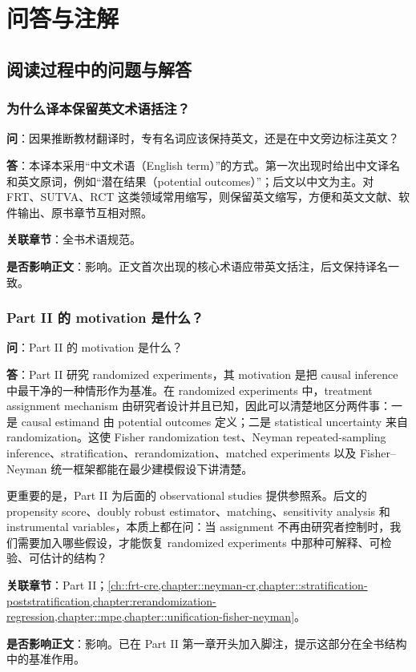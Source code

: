 \chapter{问答与注解}

\section{阅读过程中的问题与解答}

\subsection{为什么译本保留英文术语括注？}\label{sec:qa-english-term-parentheses}

\textbf{问}：因果推断教材翻译时，专有名词应该保持英文，还是在中文旁边标注英文？

\textbf{答}：本译本采用“中文术语（English term）”的方式。第一次出现时给出中文译名和英文原词，例如“潜在结果（potential outcomes）”；后文以中文为主。对 FRT、SUTVA、RCT 这类领域常用缩写，则保留英文缩写，方便和英文文献、软件输出、原书章节互相对照。

\textbf{关联章节}：全书术语规范。

\textbf{是否影响正文}：影响。正文首次出现的核心术语应带英文括注，后文保持译名一致。

\subsection{Part II 的 motivation 是什么？}\label{sec:qa-part-ii-motivation}

\textbf{问}：Part II 的 motivation 是什么？

\textbf{答}：Part II 研究 randomized experiments，其 motivation 是把 causal inference 中最干净的一种情形作为基准。在 randomized experiments 中，treatment assignment mechanism 由研究者设计并且已知，因此可以清楚地区分两件事：一是 causal estimand 由 potential outcomes 定义；二是 statistical uncertainty 来自 randomization。这使 Fisher randomization test、Neyman repeated-sampling inference、stratification、rerandomization、matched experiments 以及 Fisher--Neyman 统一框架都能在最少建模假设下讲清楚。

更重要的是，Part II 为后面的 observational studies 提供参照系。后文的 propensity score、doubly robust estimator、matching、sensitivity analysis 和 instrumental variables，本质上都在问：当 assignment 不再由研究者控制时，我们需要加入哪些假设，才能恢复 randomized experiments 中那种可解释、可检验、可估计的结构？

\textbf{关联章节}：Part II；\cref{ch::frt-cre,chapter::neyman-cr,chapter::stratification-poststratification,chapter:rerandomization-regression,chapter::mpe,chapter::unification-fisher-neyman}。

\textbf{是否影响正文}：影响。已在 Part II 第一章开头加入脚注，提示这部分在全书结构中的基准作用。
